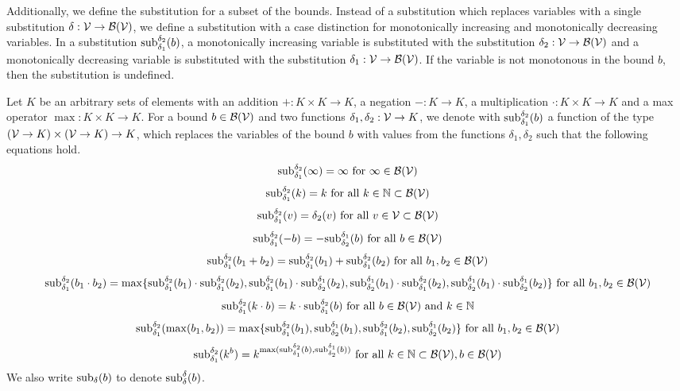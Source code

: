 Additionally, we define the substitution for a subset of the bounds.
Instead of a substitution which replaces variables with a single substitution $\delta: \VSet \rightarrow \BoundSet(\VSet)$, we define a substitution with a case distinction for monotonically increasing and monotonically decreasing variables.
In a substitution $\apprsubst{b}{\delta_1}{\delta_2}$, a monotonically increasing variable is substituted with the substitution $\delta_2: \VSet \rightarrow \BoundSet(\VSet)$ and a monotonically decreasing variable is substituted with the substitution $\delta_1: \VSet \rightarrow \BoundSet(\VSet)$.
If the variable is not monotonous in the bound $b$, then the substitution is undefined.
\begin{definition}
  Let $K$ be an arbitrary sets of elements with an addition $+: K \times K \rightarrow K$, a negation $-: K \rightarrow K$, a multiplication $\cdot: K \times K \rightarrow K$ and a max operator $\max: K \times K \rightarrow K$.
  For a bound $b \in \BoundSet(\VSet)$ and two functions $\delta_1, \delta_2: \VSet \rightarrow K$, we denote with $\apprsubst{b}{\delta_1}{\delta_2}$ a function of the type $(\VSet \rightarrow K) \times (\VSet \rightarrow K) \rightarrow K$, which replaces the variables of the bound $b$ with values from the functions $\delta_1, \delta_2$ such that the following equations hold.
  \[ \apprsubst{\infty}{\delta_1}{\delta_2} = \infty \text{ for } \infty \in \BoundSet(\VSet) \]
  \[ \apprsubst{k}{\delta_1}{\delta_2} = k \text{ for all } k \in \mathbb{N} \subset \BoundSet(\VSet) \] 
  \[ \apprsubst{v}{\delta_1}{\delta_2} = \delta_2(v) \text{ for all } v \in \VSet \subset \BoundSet(\VSet) \] 
  \[ \apprsubst{-b}{\delta_1}{\delta_2} = -\apprsubst{b}{\delta_2}{\delta_1} \text{ for all } b \in \BoundSet(\VSet) \] 
  \[ \apprsubst{b_1 + b_2}{\delta_1}{\delta_2} = \apprsubst{b_1}{\delta_1}{\delta_2} + \apprsubst{b_2}{\delta_1}{\delta_2} \text{ for all } b_1, b_2 \in \BoundSet(\VSet) \] 
  \[ \apprsubst{b_1 \cdot b_2}{\delta_1}{\delta_2} = \maximum{
    \apprsubst{b_1}{\delta_1}{\delta_2} \cdot \apprsubst{b_2}{\delta_1}{\delta_2},
    \apprsubst{b_1}{\delta_1}{\delta_2} \cdot \apprsubst{b_2}{\delta_2}{\delta_1},
    \apprsubst{b_1}{\delta_2}{\delta_1} \cdot \apprsubst{b_2}{\delta_1}{\delta_2},
    \apprsubst{b_1}{\delta_2}{\delta_1} \cdot \apprsubst{b_2}{\delta_2}{\delta_1}
  } \text{ for all } b_1, b_2 \in \BoundSet(\VSet) \] 
  \[ \apprsubst{k \cdot b}{\delta_1}{\delta_2} = k \cdot \apprsubst{b}{\delta_1}{\delta_2} \text{ for all } b \in \BoundSet(\VSet) \text{ and } k \in \mathbb{N} \] 
  \[ \apprsubst{\max(b_1, b_2)}{\delta_1}{\delta_2} = \maximum{\apprsubst{b_1}{\delta_1}{\delta_2}, \apprsubst{b_1}{\delta_2}{\delta_1}, \apprsubst{b_2}{\delta_1}{\delta_2}, \apprsubst{b_2}{\delta_2}{\delta_1}} \text{ for all } b_1, b_2 \in \BoundSet(\VSet) \]
  \[ \apprsubst{k^b}{\delta_1}{\delta_2} = k^{\max(\apprsubst{b}{\delta_1}{\delta_2}, \apprsubst{b}{\delta_2}{\delta_1})} \text{ for all } k \in \mathbb{N} \subset \BoundSet(\VSet), b \in \BoundSet(\VSet) \]  
  We also write $\exactsubst{b}{\delta}$ to denote $\apprsubst{b}{\delta}{\delta}$.
\end{definition}

